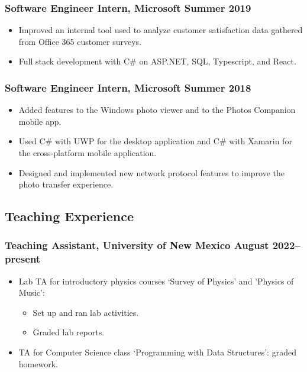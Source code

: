 \documentclass{article}
\begin{document}
		\subsubsection*{Software Engineer Intern, Microsoft \hfill \normalfont \normalsize Summer 2019}
		\begin{itemize}[noitemsep,leftmargin=40pt]
			\item Improved an internal tool used to analyze customer satisfaction data gathered from Office 365 customer surveys.
			\item Full stack development with C\# on ASP.NET, SQL, Typescript, and React.
		\end{itemize}
		\subsubsection*{Software Engineer Intern, Microsoft \hfill \normalfont \normalsize Summer 2018}
		\begin{itemize}[noitemsep,leftmargin=40pt]
			\item Added features to the Windows photo viewer and to the Photos Companion mobile app.
			\item Used C\# with UWP for the desktop application and C\# with Xamarin for the cross-platform mobile application.
			\item Designed and implemented new network protocol features to improve the photo transfer experience.
		\end{itemize}
	
	\subsection*{Teaching Experience}
		\subsubsection*{Teaching Assistant, University of New Mexico \hfill \normalfont \normalsize August 2022--present}
		\begin{itemize}[noitemsep,leftmargin=40pt]
			\item Lab TA for introductory physics courses `Survey of Physics' and 'Physics of Music':
			\begin{itemize}
				\item Set up and ran lab activities.
				\item Graded lab reports.
			\end{itemize}
			\item TA for Computer Science class `Programming with Data Structures': graded homework.
		\end{itemize}
\end{document}
